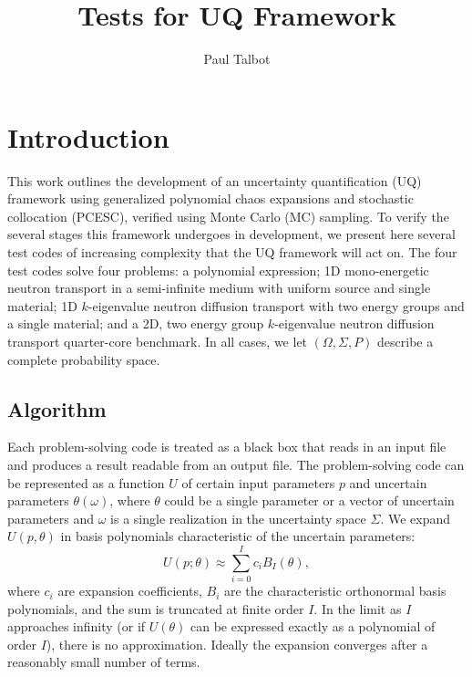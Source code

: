 \documentclass[11pt]{article} %
\title{Tests for UQ Framework}
\author{Paul Talbot}
\begin{document}
\maketitle
\section{Introduction}
This work outlines the development of an uncertainty quantification (UQ) framework using generalized polynomial chaos expansions and stochastic collocation (PCESC), verified using Monte Carlo (MC) sampling.  To verify the several stages this framework undergoes in development, we present here several test codes of increasing complexity that the UQ framework will act on.  The four test codes solve four problems: a polynomial expression; 1D mono-energetic neutron transport in a semi-infinite medium with uniform source and single material; 1D $k$-eigenvalue neutron diffusion transport with two energy groups and a single material; and a 2D, two energy group $k$-eigenvalue neutron diffusion transport quarter-core benchmark.  In all cases, we let $(\Omega,\Sigma,P)$ describe a complete probability space.

\subsection{Algorithm}
Each problem-solving code is treated as a black box that reads in an input file and produces a result readable from an output file.  The problem-solving code can be represented as a function $U$ of certain input parameters $p$ and uncertain parameters $\theta(\omega)$, where $\theta$ could be a single parameter or a vector of uncertain parameters and $\omega$ is a single realization in the uncertainty space $\Sigma$.  We expand $U(p,\theta)$ in basis polynomials characteristic of the uncertain parameters:
\begin{equation}
U(p;\theta) \approx \sum_{i=0}^I c_i B_I(\theta),
\end{equation}
where $c_i$ are expansion coefficients, $B_i$ are the characteristic orthonormal basis polynomials, and the sum is truncated at finite order $I$.  In the limit as $I$ approaches infinity (or if $U(\theta)$ can be expressed exactly as a polynomial of order $I$), there is no approximation.  Ideally the expansion converges after a reasonably small number of terms.
\end{document}
